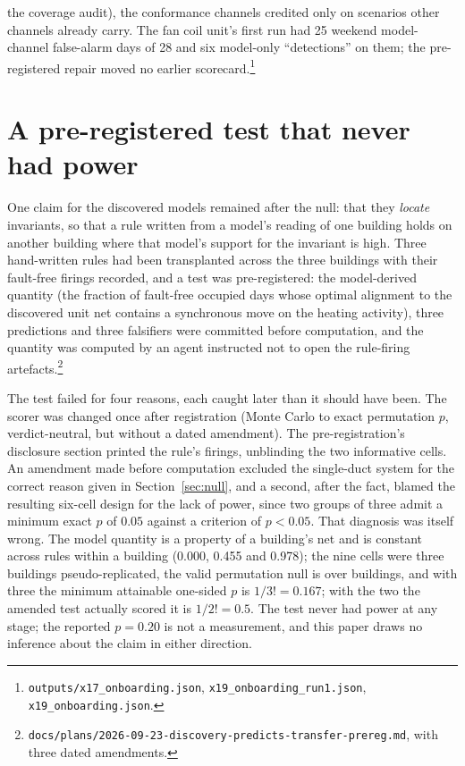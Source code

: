 \documentclass[runningheads]{llncs}
\begin{document}
the coverage audit), the conformance channels credited only on scenarios other channels already carry. The fan coil unit's first run had 25 weekend model-channel false-alarm days of 28 and six model-only ``detections'' on them; the pre-registered repair moved no earlier scorecard.\footnote{\texttt{outputs/x17\_onboarding.json}, \texttt{x19\_onboarding\_run1.json}, \texttt{x19\_onboarding.json}.}

\section{A pre-registered test that never had power}
\label{sec:transfer}

One claim for the discovered models remained after the null: that they \emph{locate} invariants, so that a rule written from a model's reading of one building holds on another building where that model's support for the invariant is high. Three hand-written rules had been transplanted across the three buildings with their fault-free firings recorded, and a test was pre-registered: the model-derived quantity (the fraction of fault-free occupied days whose optimal alignment to the discovered unit net contains a synchronous move on the heating activity), three predictions and three falsifiers were committed before computation, and the quantity was computed by an agent instructed not to open the rule-firing artefacts.\footnote{\texttt{docs/plans/2026-09-23-discovery-predicts-transfer-prereg.md}, with three dated amendments.}

The test failed for four reasons, each caught later than it should have been. The scorer was changed once after registration (Monte Carlo to exact permutation $p$, verdict-neutral, but without a dated amendment). The pre-registration's disclosure section printed the rule's firings, unblinding the two informative cells. An amendment made before computation excluded the single-duct system for the correct reason given in Section~\ref{sec:null}, and a second, after the fact, blamed the resulting six-cell design for the lack of power, since two groups of three admit a minimum exact $p$ of $0.05$ against a criterion of $p < 0.05$. That diagnosis was itself wrong. The model quantity is a property of a building's net and is constant across rules within a building (0.000, 0.455 and 0.978); the nine cells were three buildings pseudo-replicated, the valid permutation null is over buildings, and with three the minimum attainable one-sided $p$ is $1/3! = 0.167$; with the two the amended test actually scored it is $1/2! = 0.5$. The test never had power at any stage; the reported $p = 0.20$ is not a measurement, and this paper draws no inference about the claim in either direction.
\end{document}
